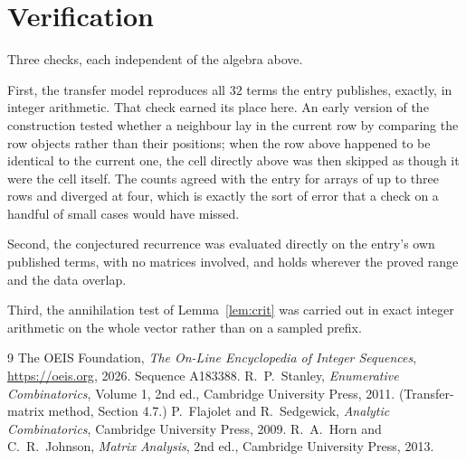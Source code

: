 \documentclass[11pt,a4paper]{article}
\theoremstyle{plain}
\theoremstyle{definition}
\begin{document}
\section{Verification}

Three checks, each independent of the algebra above.

First, the transfer model reproduces all $32$ terms the entry publishes, exactly, in
integer arithmetic. That check earned its place here. An early version of the construction
tested whether a neighbour lay in the current row by comparing the row objects rather
than their positions; when the row above happened to be identical to the current one, the
cell directly above was then skipped as though it were the cell itself. The counts agreed with
the entry for arrays of up to three rows and diverged at four, which is exactly the sort of
error that a check on a handful of small cases would have missed.

Second, the conjectured recurrence was evaluated directly on the entry's own published terms,
with no matrices involved, and holds wherever the proved range and the data overlap.

Third, the annihilation test of Lemma~\ref{lem:crit} was carried out in exact integer
arithmetic on the whole vector rather than on a sampled prefix.

\begin{thebibliography}{9}
 The OEIS Foundation, \emph{The On-Line Encyclopedia of Integer
Sequences}, \url{https://oeis.org}, 2026. Sequence A183388.
 R.~P.~Stanley, \emph{Enumerative Combinatorics}, Volume 1, 2nd ed.,
Cambridge University Press, 2011. (Transfer-matrix method, Section 4.7.)
 P.~Flajolet and R.~Sedgewick, \emph{Analytic Combinatorics}, Cambridge
University Press, 2009.
 R.~A.~Horn and C.~R.~Johnson, \emph{Matrix Analysis}, 2nd ed., Cambridge
University Press, 2013.
\end{thebibliography}
\end{document}
